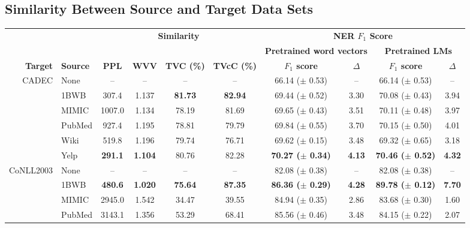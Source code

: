 \documentclass[11pt,a4paper]{article}
\begin{document}
\subsection{Similarity Between Source and Target Data Sets}
\label{section:similarity_results}
\begin{table*}[ht!]
\begin{small}
\begin{center}
\setlength{\tabcolsep}{4pt} \begin{tabular}{r l | c c c c | c c | c c }
\toprule
& & \multicolumn{4}{c}{\bf Similarity} & \multicolumn{4}{|c}{\bf NER $F_1$ Score} \\ 
\cline{7-10}
& & \multicolumn{4}{c}{} & \multicolumn{2}{|c}{\bf Pretrained word vectors} & \multicolumn{2}{|c}{\bf Pretrained LMs} \\ 
\cline{3-6}\cline{7-10} \noalign{\vskip\arrayrulewidth} 
\bf Target & \bf Source & \bf PPL & \bf WVV & \bf TVC (\%) & \bf TVcC (\%) & \bf $F_1$ score & \bf $\Delta$ & \bf $F_1$ score & \bf $\Delta$ \\ \midrule
\multirow{6}{*}{CADEC} & None & -- & -- & -- & -- & 66.14 ($\pm$ 0.53) & -- & 66.14 ($\pm$ 0.53) & -- \\ 
 & 1BWB & \phantom{0}307.4 & 1.137 & \bf 81.73 & \bf 82.94 & 69.44 ($\pm$ 0.52) & 3.30 & 70.08 ($\pm$ 0.43) & 3.94 \\
 & MIMIC & 1007.0 & 1.134 & 78.19 & 81.69 & 69.65 ($\pm$ 0.43) & 3.51 & 70.11 ($\pm$ 0.48) & 3.97\\
 & PubMed & \phantom{0}927.4 & 1.195 & 78.81 & 79.79 & 69.84 ($\pm$ 0.55) & 3.70 & 70.15 ($\pm$ 0.50) & 4.01 \\
 & Wiki & \phantom{0}519.8 & 1.196 & 79.74 & 76.71 & 69.62 ($\pm$ 0.15) & 3.48 & 69.32 ($\pm$ 0.65) & 3.18 \\
 & Yelp & \bf \phantom{0}291.1 & \bf 1.104 & 80.76 & 82.28 & \bf 70.27 ($\pm$ 0.34) & \bf 4.13 & \bf 70.46 ($\pm$ 0.52) & \bf 4.32 \\ 
\midrule
\multirow{6}{*}{CoNLL2003} & None & -- & -- & -- & -- & 82.08 ($\pm$ 0.38) & -- & 82.08 ($\pm$ 0.38) & -- \\ 
 & 1BWB & \bf \phantom{0}480.6 & \bf 1.020 & \bf 75.64 & \bf 87.35 & \bf 86.36 ($\pm$ 0.29) & \bf 4.28 & \bf 89.78 ($\pm$ 0.12) & \bf 7.70 \\
 & MIMIC & 2945.0 & 1.542 & 34.47 & 39.55 & 84.94 ($\pm$ 0.35) & 2.86 & 83.68 ($\pm$ 0.30) & 1.60 \\
 & PubMed & 3143.1 & 1.356 & 53.29 & 68.41 & 85.56 ($\pm$ 0.46) & 3.48 & 84.15 ($\pm$ 0.22) & 2.07 \\

\end{tabular}
\end{center}
\end{small}
\end{table*}
\end{document}
